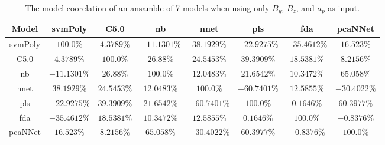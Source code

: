 \begin{table}[!ht]
	\centering
	\begin{tabular}{|c|c|c|c|c|c|c|c|}
		\hline
		Model & svmPoly & C5.0 & nb & nnet & pls & fda & pcaNNet \\ \hline
		svmPoly & $100.0\%$ & $4.3789\%$ & $-11.1301\%$ & $38.1929\%$ & $-22.9275\%$ & $-35.4612\%$ & $16.523\%$ \\ \hline
		C5.0 & $4.3789\%$ & $100.0\%$ & $26.88\%$ & $24.5453\%$ & $39.3909\%$ & $18.5381\%$ & $8.2156\%$ \\ \hline
		nb & $-11.1301\%$ & $26.88\%$ & $100.0\%$ & $12.0483\%$ & $21.6542\%$ & $10.3472\%$ & $65.058\%$ \\ \hline
		nnet & $38.1929\%$ & $24.5453\%$ & $12.0483\%$ & $100.0\%$ & $-60.7401\%$ & $12.5855\%$ & $-30.4022\%$ \\ \hline
		pls & $-22.9275\%$ & $39.3909\%$ & $21.6542\%$ & $-60.7401\%$ & $100.0\%$ & $0.1646\%$ & $60.3977\%$ \\ \hline
		fda & $-35.4612\%$ & $18.5381\%$ & $10.3472\%$ & $12.5855\%$ & $0.1646\%$ & $100.0\%$ & $-0.8376\%$ \\ \hline
		pcaNNet & $16.523\%$ & $8.2156\%$ & $65.058\%$ & $-30.4022\%$ & $60.3977\%$ & $-0.8376\%$ & $100.0\%$ \\ \hline
	\end{tabular}
	\caption{The model coorelation of an ansamble of 7 models when using only $B_{y}$, $B_{z}$, and $a_{p}$ as input.}
	\label{tab:ansamble7:yzap}
\end{table}
